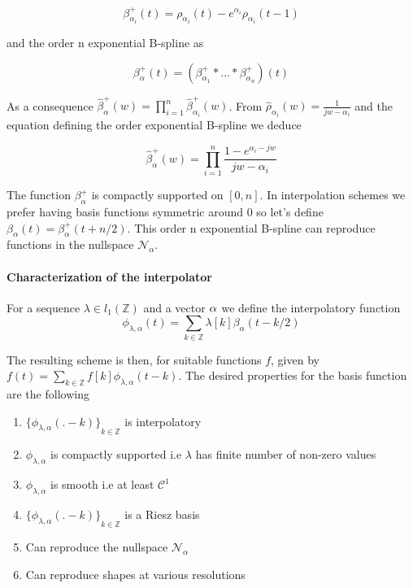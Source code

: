 \documentclass[a4paper, 11pt]{article}
\begin{document}
\begin{equation}
  \beta^+_{\alpha_i}(t) = \rho_{\alpha_i}(t) - e^{\alpha_i}\rho_{\alpha_i}(t-1)
\end{equation}

and the order n exponential B-spline as

\begin{equation}
  \beta^+_{\alpha}(t) = (\beta^+_{\alpha_1} * \ldots * \beta^+_{\alpha_n})(t)
\end{equation}

As a consequence $\displaystyle \hat{\beta}^+_{\alpha}(w) = \prod_{i=1}^n \hat{\beta}^+_{\alpha_i}(w)$. From 
$\hat{\rho}_{\alpha_i}(w) = \frac{1}{jw-\alpha_i}$ and the equation defining the order exponential B-spline we deduce

\begin{equation}
  \hat{\beta}^+_{\alpha}(w) = \prod_{i=1}^n \frac{1-e^{\alpha_i-jw} }{jw-\alpha_i}
\end{equation}

The function $\beta^+_{\alpha}$ is compactly supported on $[0, n]$. In interpolation schemes we prefer having basis 
functions symmetric around 0 so let's define $\beta_{\alpha}(t) = \beta^+_{\alpha}(t+n/2)$. This order n exponential 
B-spline can reproduce functions in the nullspace $\mathcal{N}_{\alpha}$. 

\paragraph{Characterization of the interpolator}

\begin{deftn}{1}
  For a sequence $\lambda \in l_1(\mathbb{Z})$ and a vector ${\bf \alpha}$ we define the interpolatory function
  \begin{equation}
    \phi_{\lambda, \alpha}(t) = \sum_{k \in \mathbb{Z}} \lambda[k] \beta_{\alpha}(t-k/2)
  \end{equation}
\end{deftn}

The resulting scheme is then, for suitable functions $f$, given by $f(t) = \sum_{k \in \mathbb{Z}}f[k] \phi_{\lambda, 
\alpha}(t-k)$.  The desired properties for the basis function are the following

\begin{enumerate}
  \item ${\{ \phi_{\lambda, \alpha}(.-k) \}}_{k \in \mathbb{Z}}$ is interpolatory
  \item $\phi_{\lambda, \alpha}$ is compactly supported i.e $\lambda$ has finite number of non-zero values
  \item $\phi_{\lambda, \alpha}$ is smooth i.e at least $\mathcal{C}^1$
  \item ${\{ \phi_{\lambda, \alpha}(.-k) \}}_{k \in \mathbb{Z}}$ is a Riesz basis
  \item Can reproduce the nullspace $\mathcal{N}_{\alpha}$
  \item Can reproduce shapes at various resolutions
\end{enumerate}
\end{document}
